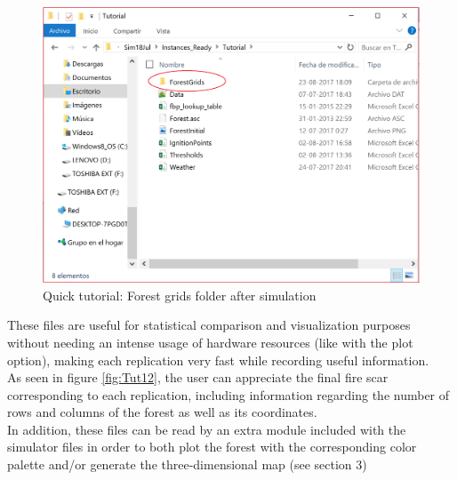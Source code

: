 \documentclass[11pt]{article}
\begin{document}
\begin{enumerate}
\begin{itemize}
\begin{figure}[h!]
\centering
\includegraphics[scale=0.6]{Tutorial10.png}
\caption{\label{fig:Tut10} Quick tutorial: Forest grids folder after simulation}
\end{figure} 

These files are useful for statistical comparison and visualization purposes without needing an intense usage of hardware resources (like with the plot option), making each replication very fast while recording useful information. \\

As seen in figure \ref{fig:Tut12}, the user can appreciate the final fire scar corresponding to each replication, including information regarding the number of rows and columns of the forest as well as its coordinates.\\

In addition, these files can be read by an extra module included with the simulator files in order to both plot the forest with the corresponding color palette and/or generate the three-dimensional map (see section 3)
			

\end{itemize}
\end{enumerate}
\end{document}
